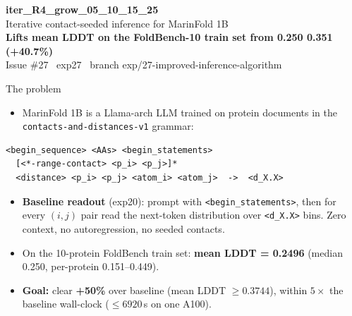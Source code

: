 \documentclass[aspectratio=169,11pt]{beamer}
\newcommand{\code}[1]{\texttt{\small\color{navy}#1}}
\begin{document}
\begin{frame}[plain]
  \begin{center}
    \vspace{1.0cm}
    {\Huge\bfseries\ttfamily\color{navy}iter\_R4\_grow\_05\_10\_15\_25}\\[0.6cm]
    {\Large\color{navy}Iterative contact-seeded inference for MarinFold 1B}\\[0.7cm]
    {\large\color{green}\bfseries Lifts mean LDDT on the FoldBench-10 train set from
      0.250 \textrightarrow{} 0.351 \quad (+40.7\%)}\\[1.5cm]
    {\small\color{grey}\ttfamily Issue \#27 \textperiodcentered\ exp27 \textperiodcentered\
      branch exp/27-improved-inference-algorithm}
  \end{center}
\end{frame}

\begin{frame}[fragile]{The problem}
  \begin{itemize}
    \setlength\itemsep{0.4em}
    \item MarinFold 1B is a Llama-arch LLM trained on protein documents in the
          \code{contacts-and-distances-v1} grammar:
  \end{itemize}
  \begin{lstlisting}[style=code]
<begin_sequence> <AAs> <begin_statements>
  [<*-range-contact> <p_i> <p_j>]*
  <distance> <p_i> <p_j> <atom_i> <atom_j>  ->  <d_X.X>
  \end{lstlisting}
  \begin{itemize}
    \setlength\itemsep{0.4em}
    \item \textbf{Baseline readout} (exp20): prompt with \code{<begin\_statements>},
          then for every $(i, j)$ pair read the next-token distribution over
          \code{<d\_X.X>} bins. Zero context, no autoregression, no seeded contacts.
    \item On the 10-protein FoldBench train set: \textbf{mean LDDT = 0.2496}
          (median 0.250, per-protein 0.151--0.449).
    \item \textbf{\color{green}Goal:} clear \textbf{+50\%} over baseline (mean LDDT
          $\geq 0.3744$), within $5\times$ the baseline wall-clock
          ($\leq 6920$\,s on one A100).
  \end{itemize}
\end{frame}
\end{document}
